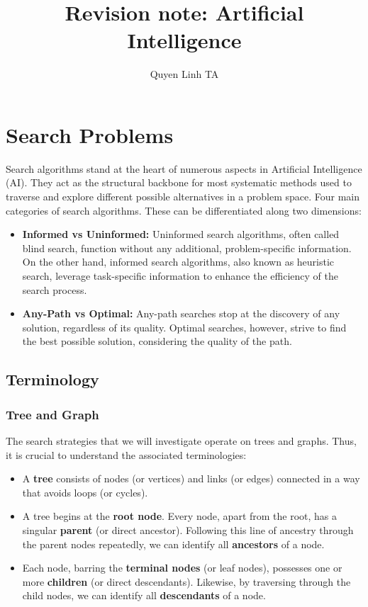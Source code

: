 \documentclass[a4paper,UKenglish,cleveref, autoref, thm-restate]{qlinhta}
\title{Revision note: Artificial Intelligence}
\author{Quyen Linh TA}{University Paris Dauphine, PSL}{quyen-linh.ta@dauphine.eu}{}{}
\begin{document}
\maketitle

\tableofcontents
\section{Search Problems}
Search algorithms stand at the heart of numerous aspects in Artificial Intelligence (AI). They act as the structural backbone for most systematic methods used to traverse and explore different possible alternatives in a problem space. Four main categories of search algorithms. These can be differentiated along two dimensions:

\begin{itemize}
    \item \textbf{Informed vs Uninformed:} Uninformed search algorithms, often called blind search, function without any additional, problem-specific information. On the other hand, informed search algorithms, also known as heuristic search, leverage task-specific information to enhance the efficiency of the search process.
    \item \textbf{Any-Path vs Optimal:} Any-path searches stop at the discovery of any solution, regardless of its quality. Optimal searches, however, strive to find the best possible solution, considering the quality of the path.
\end{itemize}
\subsection{Terminology}
\subsubsection{Tree and Graph}
The search strategies that we will investigate operate on trees and graphs. Thus, it is crucial to understand the associated terminologies:

\begin{itemize}
    \item A \textbf{tree} consists of nodes (or vertices) and links (or edges) connected in a way that avoids loops (or cycles).
    \item A tree begins at the \textbf{root node}. Every node, apart from the root, has a singular \textbf{parent} (or direct ancestor). Following this line of ancestry through the parent nodes repeatedly, we can identify all \textbf{ancestors} of a node.
    \item Each node, barring the \textbf{terminal nodes} (or leaf nodes), possesses one or more \textbf{children} (or direct descendants). Likewise, by traversing through the child nodes, we can identify all \textbf{descendants} of a node.
\end{itemize}
\end{document}
